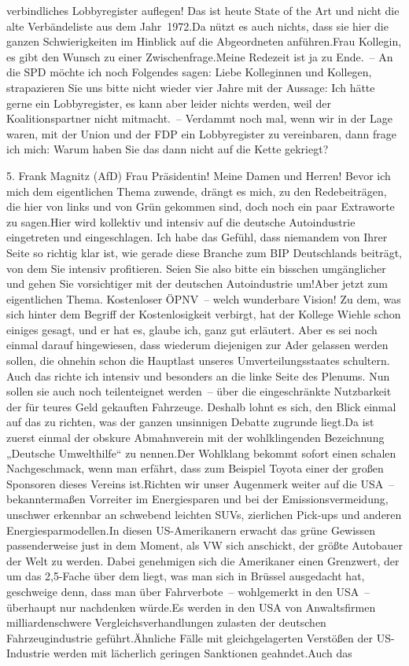 \documentclass{article}
\begin{document}
verbindliches Lobbyregister auflegen! Das ist heute State of the Art und nicht die alte Verbändeliste aus dem Jahr 1972.Da nützt es auch nichts, dass sie hier die ganzen Schwierigkeiten im Hinblick auf die Abgeordneten anführen.Frau Kollegin, es gibt den Wunsch zu einer Zwischenfrage.Meine Redezeit ist ja zu Ende. – An die SPD möchte ich noch Folgendes sagen: Liebe Kolleginnen und Kollegen, strapazieren Sie uns bitte nicht wieder vier Jahre mit der Aussage: Ich hätte gerne ein Lobbyregister, es kann aber leider nichts werden, weil der Koalitionspartner nicht mitmacht. – Verdammt noch mal, wenn wir in der Lage waren, mit der Union und der FDP ein Lobbyregister zu vereinbaren, dann frage ich mich: Warum haben Sie das dann nicht auf die Kette gekriegt?




	5. Frank Magnitz (AfD) Frau Präsidentin! Meine Damen und Herren! Bevor ich mich dem eigentlichen Thema zuwende, drängt es mich, zu den Redebeiträgen, die hier von links und von Grün gekommen sind, doch noch ein paar Extraworte zu sagen.Hier wird kollektiv und intensiv auf die deutsche Autoindustrie eingetreten und eingeschlagen. Ich habe das Gefühl, dass niemandem von Ihrer Seite so richtig klar ist, wie gerade diese Branche zum BIP Deutschlands beiträgt, von dem Sie intensiv profitieren. Seien Sie also bitte ein bisschen umgänglicher und gehen Sie vorsichtiger mit der deutschen Autoindustrie um!Aber jetzt zum eigentlichen Thema. Kostenloser ÖPNV – welch wunderbare Vision! Zu dem, was sich hinter dem Begriff der Kostenlosigkeit verbirgt, hat der Kollege Wiehle schon einiges gesagt, und er hat es, glaube ich, ganz gut erläutert. Aber es sei noch einmal darauf hingewiesen, dass wiederum diejenigen zur Ader gelassen werden sollen, die ohnehin schon die Hauptlast unseres Umverteilungsstaates schultern. Auch das richte ich intensiv und besonders an die linke Seite des Plenums. Nun sollen sie auch noch teilenteignet werden – über die eingeschränkte Nutzbarkeit der für teures Geld gekauften Fahrzeuge. Deshalb lohnt es sich, den Blick einmal auf das zu richten, was der ganzen unsinnigen Debatte zugrunde liegt.Da ist zuerst einmal der obskure Abmahnverein mit der wohlklingenden Bezeichnung „Deutsche Umwelthilfe“ zu nennen.Der Wohlklang bekommt sofort einen schalen Nachgeschmack, wenn man erfährt, dass zum Beispiel Toyota einer der großen Sponsoren dieses Vereins ist.Richten wir unser Augenmerk weiter auf die USA – bekanntermaßen Vorreiter im Energiesparen und bei der Emissionsvermeidung, unschwer erkennbar an schwebend leichten SUVs, zierlichen Pick-ups und anderen Energiesparmodellen.In diesen US-Amerikanern erwacht das grüne Gewissen passenderweise just in dem Moment, als VW sich anschickt, der größte Autobauer der Welt zu werden. Dabei genehmigen sich die Amerikaner einen Grenzwert, der um das 2,5-Fache über dem liegt, was man sich in Brüssel ausgedacht hat, geschweige denn, dass man über Fahrverbote – wohlgemerkt in den USA – überhaupt nur nachdenken würde.Es werden in den USA von Anwaltsfirmen milliardenschwere Vergleichsverhandlungen zulasten der deutschen Fahrzeugindustrie geführt.Ähnliche Fälle mit gleichgelagerten Verstößen der US-Industrie werden mit lächerlich geringen Sanktionen geahndet.Auch das 
\end{document}
